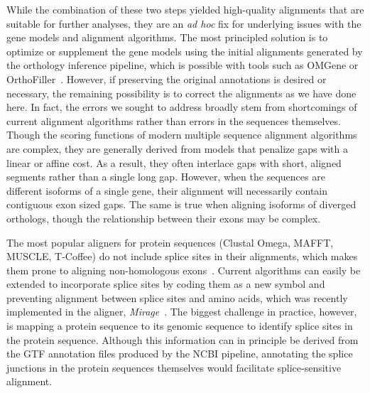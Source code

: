 While the combination of these two steps yielded high-quality alignments that are suitable for further analyses, they are an \textit{ad hoc} fix for underlying issues with the gene models and alignment algorithms. The most principled solution is to optimize or supplement the gene models using the initial alignments generated by the orthology inference pipeline, which is possible with tools such as OMGene or OrthoFiller~\cite{Dunne2018, Dunne2017}. However, if preserving the original annotations is desired or necessary, the remaining possibility is to correct the alignments as we have done here. In fact, the errors we sought to address broadly stem from shortcomings of current alignment algorithms rather than errors in the sequences themselves. Though the scoring functions of modern multiple sequence alignment algorithms are complex, they are generally derived from models that penalize gaps with a linear or affine cost. As a result, they often interlace gaps with short, aligned segments rather than a single long gap. However, when the sequences are different isoforms of a single gene, their alignment will necessarily contain contiguous exon sized gaps. The same is true when aligning isoforms of diverged orthologs, though the relationship between their exons may be complex.

The most popular aligners for protein sequences (Clustal Omega, MAFFT, MUSCLE, T-Coffee) do not include splice sites in their alignments, which makes them prone to aligning non-homologous exons~\cite{Sievers2017, Katoh2013, Edgar2004, Notredame2000}. Current algorithms can easily be extended to incorporate splice sites by coding them as a new symbol and preventing alignment between splice sites and amino acids, which was recently implemented in the aligner, \textit{Mirage}~\cite{Nord2018}. The biggest challenge in practice, however, is mapping a protein sequence to its genomic sequence to identify splice sites in the protein sequence. Although this information can in principle be derived from the GTF annotation files produced by the NCBI pipeline, annotating the splice junctions in the protein sequences themselves would facilitate splice-sensitive alignment.


